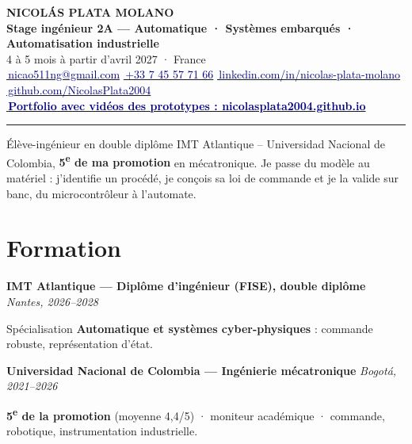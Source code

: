 \documentclass[10pt,a4paper]{article}
\newcommand{\lien}[3]{\href{#2}{\textcolor{navy}{#1\,#3}}}
\newcommand{\entree}[3]{%
  \textbf{#1}\hfill{\small\itshape\color{grey} #2}\par\vspace{0.5pt}
  {\small #3}\par\vspace{4pt}}
\begin{document}
\begin{center}
  {\LARGE\bfseries NICOLÁS PLATA MOLANO}\\[3pt]
  {\large\color{navy}\textbf{Stage ingénieur 2A — Automatique · Systèmes embarqués · Automatisation industrielle}}\\[2pt]
  {\small\color{grey}4 à 5 mois à partir d'avril 2027 \;·\; France}\\[3pt]
  {\small \lien{\faEnvelope}{mailto:nicao511ng@gmail.com}{nicao511ng@gmail.com} \quad \lien{\faPhone}{tel:+33745577166}{+33 7 45 57 71 66} \quad \lien{\faLinkedin}{https://www.linkedin.com/in/nicolas-plata-molano}{linkedin.com/in/nicolas-plata-molano} \quad \lien{\faGithub}{https://github.com/NicolasPlata2004}{github.com/NicolasPlata2004}}\\[2pt]
  {\small \lien{\faGlobe}{https://nicolasplata2004.github.io}{\textbf{Portfolio avec vidéos des prototypes : nicolasplata2004.github.io}}}
\end{center}
\vspace{-4pt}
{\color{rule}\rule{\linewidth}{0.8pt}}
\vspace{1pt}

{\small Élève-ingénieur en double diplôme IMT Atlantique – Universidad Nacional de Colombia, \textbf{5\textsuperscript{e} de ma promotion}
en mécatronique. Je passe du modèle au matériel : j'identifie un procédé, je conçois sa loi de commande et je la valide sur banc,
du microcontrôleur à l'automate.}

\section{Formation}
\entree{IMT Atlantique — Diplôme d'ingénieur (FISE), double diplôme}{Nantes, 2026–2028}{%
Spécialisation \textbf{Automatique et systèmes cyber-physiques} : commande robuste, représentation d'état.}
\entree{Universidad Nacional de Colombia — Ingénierie mécatronique}{Bogotá, 2021–2026}{%
\textbf{5\textsuperscript{e} de la promotion} (moyenne 4,4/5) \;·\; moniteur académique \;·\; commande, robotique, instrumentation industrielle.}

\end{document}
